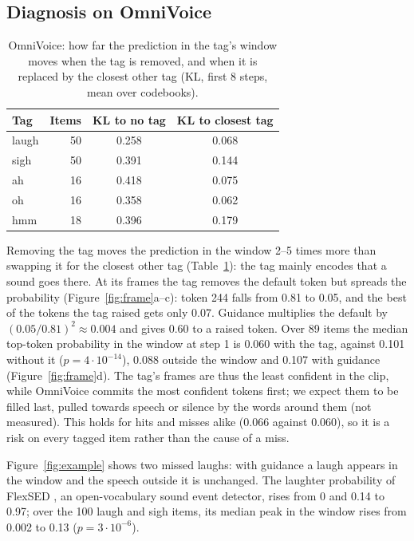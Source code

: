 \documentclass[11pt]{article}
\begin{document}
\subsection{Diagnosis on OmniVoice}
\label{sec:diagnosis}

\begin{table}[t]
  \centering
  \small
  \begin{tabular}{lrcc}
    \toprule
    Tag & Items & KL to no tag & KL to closest tag \\
    \midrule
    laugh & 50 & 0.258 & 0.068 \\
    sigh  & 50 & 0.391 & 0.144 \\
    ah    & 16 & 0.418 & 0.075 \\
    oh    & 16 & 0.358 & 0.062 \\
    hmm   & 18 & 0.396 & 0.179 \\
    \bottomrule
  \end{tabular}
  \caption{OmniVoice: how far the prediction in the tag's window moves when the tag is removed, and when it is replaced by the closest other tag (KL, first 8 steps, mean over codebooks).}
  \label{tab:kl}
\end{table}

Removing the tag moves the prediction in the window 2--5 times more than swapping it for the closest other tag (Table~\ref{tab:kl}): the tag mainly encodes that a sound goes there. At its frames the tag removes the default token but spreads the probability (Figure~\ref{fig:frame}a--c): token 244 falls from 0.81 to 0.05, and the best of the tokens the tag raised gets only 0.07. Guidance multiplies the default by $(0.05/0.81)^2 \approx 0.004$ and gives 0.60 to a raised token. Over 89 items the median top-token probability in the window at step 1 is 0.060 with the tag, against 0.101 without it ($p = 4\cdot10^{-14}$), 0.088 outside the window and 0.107 with guidance (Figure~\ref{fig:frame}d). The tag's frames are thus the least confident in the clip, while OmniVoice commits the most confident tokens first; we expect them to be filled last, pulled towards speech or silence by the words around them (not measured). This holds for hits and misses alike (0.066 against 0.060), so it is a risk on every tagged item rather than the cause of a miss.

Figure~\ref{fig:example} shows two missed laughs: with guidance a laugh appears in the window and the speech outside it is unchanged. The laughter probability of FlexSED \citep{hai2025flexsed}, an open-vocabulary sound event detector, rises from 0 and 0.14 to 0.97; over the 100 laugh and sigh items, its median peak in the window rises from 0.002 to 0.13 ($p = 3\cdot10^{-6}$).
\end{document}
